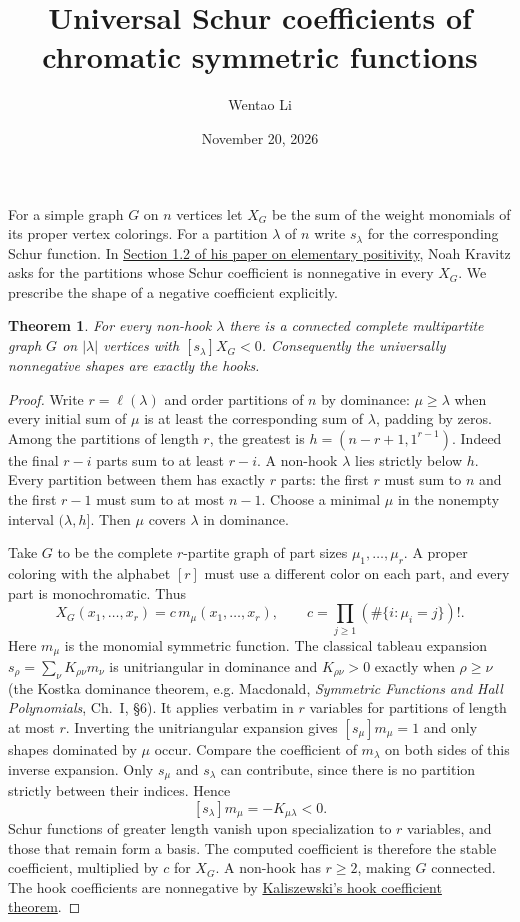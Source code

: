 \documentclass[11pt]{article}
\title{Universal Schur coefficients of chromatic symmetric functions}
\author{Wentao Li}
\date{November 20, 2026}
\newtheorem{theorem}{Theorem}
\begin{document}
\maketitle

For a simple graph $G$ on $n$ vertices let $X_G$ be the sum of the weight monomials of its proper vertex colorings. For a partition $\lambda$ of $n$ write $s_\lambda$ for the corresponding Schur function. In \href{https://doi.org/10.1007/s00026-026-00855-5}{Section 1.2 of his paper on elementary positivity}, Noah Kravitz asks for the partitions whose Schur coefficient is nonnegative in every $X_G$. We prescribe the shape of a negative coefficient explicitly.
\begin{theorem}For every non-hook $\lambda$ there is a connected complete multipartite graph $G$ on $|\lambda|$ vertices with $[s_\lambda]X_G<0$. Consequently the universally nonnegative shapes are exactly the hooks.\end{theorem}
\begin{proof}Write $r=\ell(\lambda)$ and order partitions of $n$ by dominance: $\mu\ge\lambda$ when every initial sum of $\mu$ is at least the corresponding sum of $\lambda$, padding by zeros. Among the partitions of length $r$, the greatest is $h=(n-r+1,1^{r-1})$. Indeed the final $r-i$ parts sum to at least $r-i$. A non-hook $\lambda$ lies strictly below $h$. Every partition between them has exactly $r$ parts: the first $r$ must sum to $n$ and the first $r-1$ must sum to at most $n-1$. Choose a minimal $\mu$ in the nonempty interval $(\lambda,h]$. Then $\mu$ covers $\lambda$ in dominance.

Take $G$ to be the complete $r$-partite graph of part sizes $\mu_1,\ldots,\mu_r$. A proper coloring with the alphabet $[r]$ must use a different color on each part, and every part is monochromatic. Thus
\[
 X_G(x_1,\ldots,x_r)=c\,m_\mu(x_1,\ldots,x_r),\qquad c=\prod_{j\ge1}(\#\{i:\mu_i=j\})! .
\]
Here $m_\mu$ is the monomial symmetric function. The classical tableau expansion $s_\rho=\sum_\nu K_{\rho\nu}m_\nu$ is unitriangular in dominance and $K_{\rho\nu}>0$ exactly when $\rho\ge\nu$ (the Kostka dominance theorem, e.g. Macdonald, \emph{Symmetric Functions and Hall Polynomials}, Ch.~I, \S6). It applies verbatim in $r$ variables for partitions of length at most $r$. Inverting the unitriangular expansion gives $[s_\mu]m_\mu=1$ and only shapes dominated by $\mu$ occur. Compare the coefficient of $m_\lambda$ on both sides of this inverse expansion. Only $s_\mu$ and $s_\lambda$ can contribute, since there is no partition strictly between their indices. Hence
\[
 [s_\lambda]m_\mu=-K_{\mu\lambda}<0.
\]
Schur functions of greater length vanish upon specialization to $r$ variables, and those that remain form a basis. The computed coefficient is therefore the stable coefficient, multiplied by $c$ for $X_G$. A non-hook has $r\ge2$, making $G$ connected. The hook coefficients are nonnegative by \href{https://intlpress.com/site/pub/files/_fulltext/journals/joc/2015/0006/0003/JOC-2015-0006-0003-a004.pdf}{Kaliszewski's hook coefficient theorem}.\end{proof}
\end{document}
